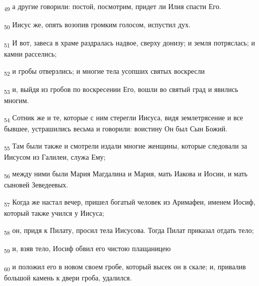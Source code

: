 \begin{tcolorbox}
\textsubscript{49} а другие говорили: постой, посмотрим, придет ли Илия спасти Его.
\end{tcolorbox}
\begin{tcolorbox}
\textsubscript{50} Иисус же, опять возопив громким голосом, испустил дух.
\end{tcolorbox}
\begin{tcolorbox}
\textsubscript{51} И вот, завеса в храме раздралась надвое, сверху донизу; и земля потряслась; и камни расселись;
\end{tcolorbox}
\begin{tcolorbox}
\textsubscript{52} и гробы отверзлись; и многие тела усопших святых воскресли
\end{tcolorbox}
\begin{tcolorbox}
\textsubscript{53} и, выйдя из гробов по воскресении Его, вошли во святый град и явились многим.
\end{tcolorbox}
\begin{tcolorbox}
\textsubscript{54} Сотник же и те, которые с ним стерегли Иисуса, видя землетрясение и все бывшее, устрашились весьма и говорили: воистину Он был Сын Божий.
\end{tcolorbox}
\begin{tcolorbox}
\textsubscript{55} Там были также и смотрели издали многие женщины, которые следовали за Иисусом из Галилеи, служа Ему;
\end{tcolorbox}
\begin{tcolorbox}
\textsubscript{56} между ними были Мария Магдалина и Мария, мать Иакова и Иосии, и мать сыновей Зеведеевых.
\end{tcolorbox}
\begin{tcolorbox}
\textsubscript{57} Когда же настал вечер, пришел богатый человек из Аримафеи, именем Иосиф, который также учился у Иисуса;
\end{tcolorbox}
\begin{tcolorbox}
\textsubscript{58} он, придя к Пилату, просил тела Иисусова. Тогда Пилат приказал отдать тело;
\end{tcolorbox}
\begin{tcolorbox}
\textsubscript{59} и, взяв тело, Иосиф обвил его чистою плащаницею
\end{tcolorbox}
\begin{tcolorbox}
\textsubscript{60} и положил его в новом своем гробе, который высек он в скале; и, привалив большой камень к двери гроба, удалился.
\end{tcolorbox}
